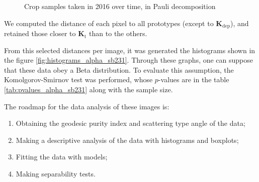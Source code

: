 \documentclass[journal]{IEEEtran}
\begin{document}
\begin{figure}[hbt]
  \centering
  \caption{Crop samples taken in 2016 over time, in Pauli decomposition}
  \label{fig:sample_images}
\end{figure}

We computed the distance of each pixel to all prototypes (except to $\bm K_{\text{dep}}$), and retained those closer to $\bm K_{\text{t}}$ than to the others.

\textcolor{red}{\hrulefill}

From this selected distances per image, it was generated the histograms shown in the figure \ref{fig:histograms_alpha_sb231}. Through these graphs, one can suppose that these data obey a Beta distribution. To evaluate this assumption, the Komolgorov-Smirnov test was performed, whose $p$-values are in the table \ref{tab:pvalues_alpha_sb231} along with the sample size.

The roadmap for the data analysis of these images is:
\begin{enumerate}
  \item Obtaining the geodesic purity index and scattering type angle of the data;
  \item Making a descriptive analysis of the data with histograms and boxplots;
  \item Fitting the data with models;
  \item Making separability tests.
\end{enumerate}
\end{document}

